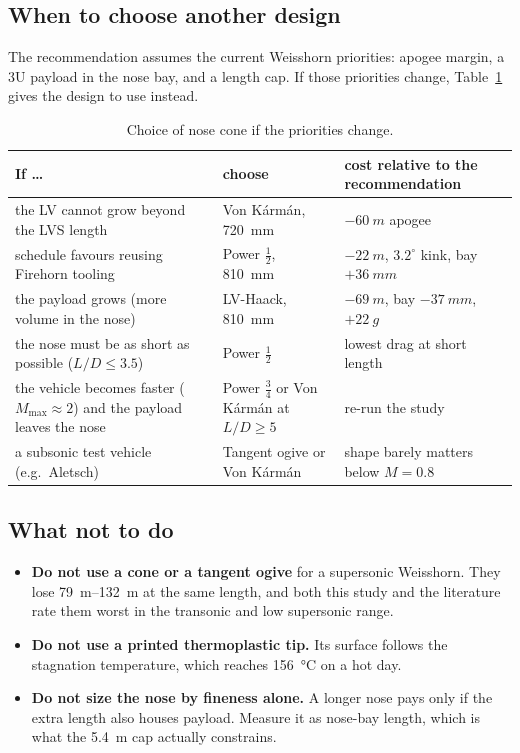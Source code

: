 \subsection{When to choose another design}

The recommendation assumes the current Weisshorn priorities: apogee margin, a 3U payload in the
nose bay, and a length cap. If those priorities change, Table~\ref{tab:alternatives} gives the
design to use instead.

\begin{table}[H]
\centering
\caption{Choice of nose cone if the priorities change.}
\label{tab:alternatives}
\small
\begin{tabular}{@{}>{\raggedright\arraybackslash}p{6.3cm}>{\raggedright\arraybackslash}p{3.6cm}>{\raggedright\arraybackslash}p{5.3cm}@{}}
\toprule
If \dots & choose & cost relative to the recommendation \\
\midrule
the LV cannot grow beyond the LVS length & Von K\'arm\'an, \SI{720}{mm} & $-\SI{60}{m}$ apogee \\
schedule favours reusing Firehorn tooling & Power $\tfrac12$, \SI{810}{mm} & $-\SI{22}{m}$, $3.2^\circ$ kink, bay $+\SI{36}{mm}$ \\
the payload grows (more volume in the nose) & LV-Haack, \SI{810}{mm} & $-\SI{69}{m}$, bay $-\SI{37}{mm}$, $+\SI{22}{g}$ \\
the nose must be as short as possible ($L/D \leq 3.5$) & Power $\tfrac12$ & lowest drag at short length \\
the vehicle becomes faster ($M_{\max} \approx 2$) and the payload leaves the nose & Power $\tfrac34$ or Von K\'arm\'an at $L/D \geq 5$ & re-run the study \\
a subsonic test vehicle (e.g.\ Aletsch) & Tangent ogive or Von K\'arm\'an & shape barely matters below $M = 0.8$ \\
\bottomrule
\end{tabular}
\end{table}

\subsection{What not to do}

\begin{itemize}[leftmargin=*,itemsep=2pt]
\item \textbf{Do not use a cone or a tangent ogive} for a supersonic Weisshorn. They lose
\SIrange{79}{132}{m} at the same length, and both this study and the literature rate them worst in
the transonic and low supersonic range.
\item \textbf{Do not use a printed thermoplastic tip.} Its surface follows the stagnation temperature,
which reaches \SI{156}{\celsius} on a hot day.
\item \textbf{Do not size the nose by fineness alone.} A longer nose pays only if the extra length
also houses payload. Measure it as nose-bay length, which is what the \SI{5.4}{m} cap actually
constrains.
\end{itemize}
